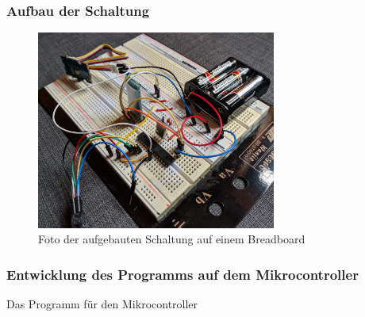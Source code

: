 \setcounter{subsection}{4}
\setcounter{subsubsection}{0}
\tocless\subsubsection{Aufbau der Schaltung}
\begin{figure}[H]
	\centering
	\includegraphics[width=0.7\textwidth]{pics/mikrocontroller.jpg}
	\caption{Foto der aufgebauten Schaltung auf einem Breadboard}
	\label{fig:mikrocon}
\end{figure}
\tocless\subsubsection{Entwicklung des Programms auf dem Mikrocontroller}
\renewcommand{\listingscaption}{Quellcode}
 \begin{longlisting}
 \caption{Das Programm für den Mikrocontroller}
 \label{listing:mikrocontroller}
 \end{longlisting}
 
